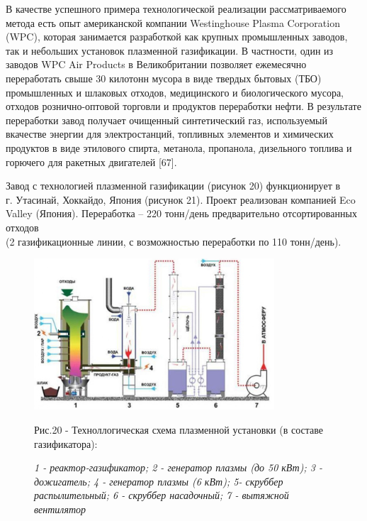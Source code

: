 В качестве успешного примера технологической реализации рассматриваемого
метода есть опыт американской компании Westinghouse Plasma Corporation
(WPC), которая занимается разработкой как крупных промышленных заводов,
так и небольших установок плазменной газификации. В частности, один из
заводов WPC Air Products в Великобритании позволяет ежемесячно
переработать свыше 30 килотонн мусора в виде твердых бытовых (ТБО)
промышленных и шлаковых отходов, медицинского и биологического мусора,
отходов рознично-оптовой торговли и продуктов переработки нефти. В
результате переработки завод получает очищенный синтетический газ,
используемый вкачестве энергии для электростанций, топливных элементов и
химических продуктов в виде этилового спирта, метанола, пропанола,
дизельного топлива и горючего для ракетных двигателей {[}67{]}.

Завод с технологией плазменной газификации (рисунок 20) функционирует
в\\
г. Утасинай, Хоккайдо, Япония (рисунок 21). Проект реализован компанией
Eco Valley (Япония). Переработка -- 220 тонн/день предварительно
отсортированных отходов\\
(2 газификационные линии, с возможностью переработки по 110 тонн/день).


\begin{figure}[H]
	\centering
	\includegraphics[width=0.8\textwidth]{media/chem2/image84}
	\caption*{Рис.20 - Техноллогическая схема плазменной установки (в составе газификатора):}
	\caption*{\normalfont\emph{1 - реактор-газификатор; 2 - генератор плазмы (до 50 кВт); 3 -
дожигатель; 4 - генератор плазмы (6 кВт); 5- скруббер распылительный; 6 - скруббер
насадочный; 7 - вытяжной вентилятор}}
\end{figure}

